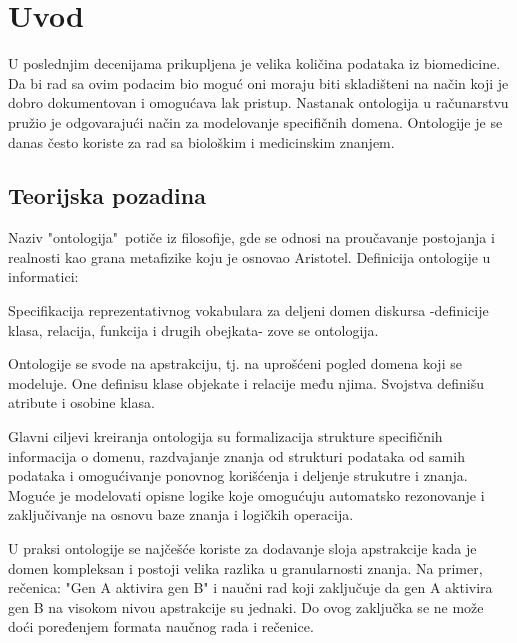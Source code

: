 \section{Uvod}
\label{sec:uvod}

U poslednjim decenijama prikupljena je velika količina podataka iz biomedicine.
Da bi rad sa ovim podacim bio moguć oni moraju biti skladišteni na način koji je
dobro dokumentovan i omogućava lak pristup.
Nastanak ontologija u računarstvu pružio je odgovarajući način za modelovanje specifičnih domena.
Ontologije je se danas često koriste za rad sa biološkim i medicinskim znanjem.

\subsection{Teorijska pozadina}

	Naziv "ontologija"\  potiče iz filosofije, gde se odnosi na proučavanje postojanja i realnosti
kao grana metafizike koju je osnovao Aristotel.
Definicija ontologije u informatici:
\begin{displayquote}
Specifikacija reprezentativnog vokabulara za deljeni domen diskursa
-definicije klasa, relacija, funkcija i drugih obejkata-
zove se ontologija.
\end{displayquote}

Ontologije se svode na apstrakciju, tj. na uprošćeni pogled domena koji se modeluje.
One definisu klase objekate i relacije među njima. Svojstva definišu atribute i osobine klasa.
\par

Glavni ciljevi kreiranja ontologija su formalizacija strukture specifičnih informacija o domenu,
razdvajanje znanja od strukturi podataka od samih podataka i omogućivanje ponovnog korišćenja 
i deljenje strukutre i znanja.
Moguće je modelovati opisne logike koje omogućuju automatsko rezonovanje i zaključivanje
na osnovu baze znanja i logičkih operacija.
\par

U praksi ontologije se najčešće koriste za dodavanje sloja apstrakcije
kada je domen kompleksan i postoji velika razlika u granularnosti znanja.
Na primer, rečenica: "Gen A aktivira gen B" i naučni rad koji zaključuje da gen A
aktivira gen B na visokom nivou apstrakcije su jednaki. Do ovog zaključka se ne može
doći poređenjem  formata naučnog rada i rečenice.
